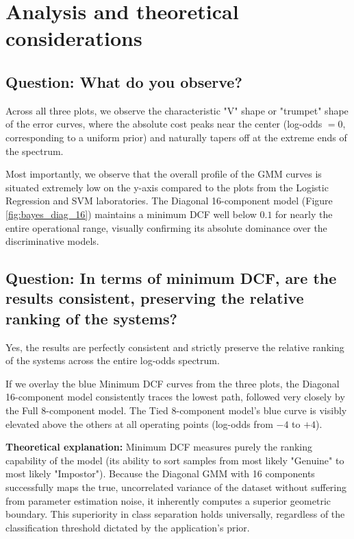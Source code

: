 \section{Analysis and theoretical considerations}

\subsection*{Question: What do you observe?}

Across all three plots, we observe the characteristic "V" shape or "trumpet" shape of the error curves, where the absolute cost peaks near the center (log-odds $= 0$, corresponding to a uniform prior) and naturally tapers off at the extreme ends of the spectrum. 

Most importantly, we observe that the overall profile of the GMM curves is situated extremely low on the y-axis compared to the plots from the Logistic Regression and SVM laboratories. The Diagonal 16-component model (Figure \ref{fig:bayes_diag_16}) maintains a minimum DCF well below $0.1$ for nearly the entire operational range, visually confirming its absolute dominance over the discriminative models.

\subsection*{Question: In terms of minimum DCF, are the results consistent, preserving the relative ranking of the systems?}

Yes, the results are perfectly consistent and strictly preserve the relative ranking of the systems across the entire log-odds spectrum. 

If we overlay the blue Minimum DCF curves from the three plots, the Diagonal 16-component model consistently traces the lowest path, followed very closely by the Full 8-component model. The Tied 8-component model's blue curve is visibly elevated above the others at all operating points (log-odds from $-4$ to $+4$). 

\textbf{Theoretical explanation:} Minimum DCF measures purely the ranking capability of the model (its ability to sort samples from most likely "Genuine" to most likely "Impostor"). Because the Diagonal GMM with 16 components successfully maps the true, uncorrelated variance of the dataset without suffering from parameter estimation noise, it inherently computes a superior geometric boundary. This superiority in class separation holds universally, regardless of the classification threshold dictated by the application's prior.

